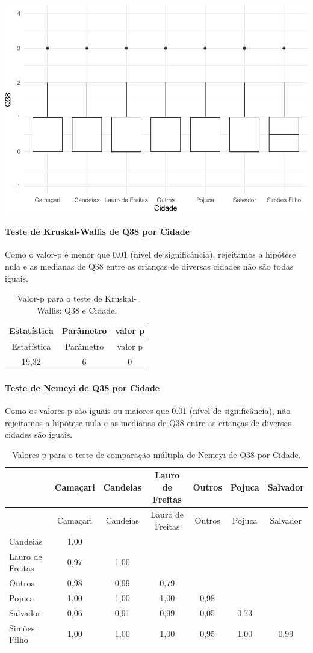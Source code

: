 \documentclass[]{article}
\let\oldparagraph\paragraph
\renewcommand{\paragraph}[1]{\oldparagraph{#1}\mbox{}}
\begin{document}
\begin{center}\includegraphics[width=0.75\linewidth]{relatorio_covid19_files/figure-latex/unnamed-chunk-1434-1} \end{center}

\hypertarget{teste-de-kruskal-wallis-de-q38-por-cidade}{%
\paragraph{Teste de Kruskal-Wallis de Q38 por Cidade}\label{teste-de-kruskal-wallis-de-q38-por-cidade}}

Como o valor-p é menor que 0.01 (nível de significância), rejeitamos a hipótese nula e as medianas de Q38 entre as crianças de diversas cidades não são todas iguais.

\begin{longtable}[]{@{}ccc@{}}
\caption{\label{tab:unnamed-chunk-1436}Valor-p para o teste de Kruskal-Wallis: Q38 e Cidade.}\tabularnewline
\toprule
Estatística & Parâmetro & valor p\tabularnewline
\midrule
\endfirsthead
\toprule
Estatística & Parâmetro & valor p\tabularnewline
\midrule
\endhead
19,32 & 6 & 0\tabularnewline
\bottomrule
\end{longtable}

\hypertarget{teste-de-nemeyi-de-q38-por-cidade}{%
\paragraph{Teste de Nemeyi de Q38 por Cidade}\label{teste-de-nemeyi-de-q38-por-cidade}}

Como os valores-p são iguais ou maiores que 0.01 (nível de significância), não rejeitamos a hipótese nula e as medianas de Q38 entre as crianças de diversas cidades são iguais.

\begin{longtable}[]{@{}lcccccc@{}}
\caption{\label{tab:unnamed-chunk-1438}Valores-p para o teste de comparação múltipla de Nemeyi de Q38 por Cidade.}\tabularnewline
\toprule
& Camaçari & Candeias & Lauro de Freitas & Outros & Pojuca & Salvador\tabularnewline
\midrule
\endfirsthead
\toprule
& Camaçari & Candeias & Lauro de Freitas & Outros & Pojuca & Salvador\tabularnewline
\midrule
\endhead
Candeias & 1,00 & & & & &\tabularnewline
Lauro de Freitas & 0,97 & 1,00 & & & &\tabularnewline
Outros & 0,98 & 0,99 & 0,79 & & &\tabularnewline
Pojuca & 1,00 & 1,00 & 1,00 & 0,98 & &\tabularnewline
Salvador & 0,06 & 0,91 & 0,99 & 0,05 & 0,73 &\tabularnewline
Simões Filho & 1,00 & 1,00 & 1,00 & 0,95 & 1,00 & 0,99\tabularnewline
\bottomrule
\end{longtable}
\end{document}
